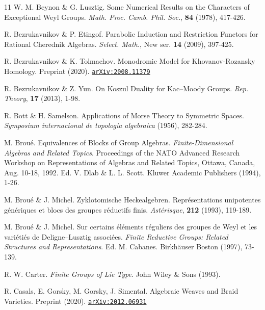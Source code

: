\documentclass[a4paper,10pt,leqno]{amsart}
\theoremstyle{plain}
\theoremstyle{plain}
\theoremstyle{plain}
\theoremstyle{definition}
\theoremstyle{remark}
\begin{document}
\begin{thebibliography}{11}
	W. M. Beynon \& G. Lusztig.
	Some Numerical Results on the Characters of Exceptional Weyl Groups.
	\textsl{Math. Proc. Camb. Phil. Soc.},
	\textbf{84}
	(1978),
	417-426.

	R. Bezrukavnikov \& P. Etingof.
	Parabolic Induction and Restriction Functors for Rational Cherednik Algebras.
	\textsl{Select. Math.},
	New ser. \textbf{14}
	(2009),
	397-425.

	R. Bezrukavnikov \& K. Tolmachov.
	Monodromic Model for Khovanov-Rozansky Homology.
	Preprint
	(2020).
	\href{http://arxiv.org/abs/2008.11379}{\texttt{arXiv:2008.11379}}
	
	R. Bezrukavnikov \& Z. Yun.
	On Koszul Duality for Kac--Moody Groups.
	\textsl{Rep. Theory},
	\textbf{17}
	(2013),
	1-98.

	R. Bott \& H. Samelson.
	Applications of Morse Theory to Symmetric Spaces.
	\textsl{Symposium internacional de topologia algebraica}
	(1956),
	282-284.

	M. Brou\'e.
	Equivalences of Blocks of Group Algebras.
	\textsl{Finite-Dimensional Algebras and Related Topics}.
	Proceedings of the NATO Advanced Research Workshop on Representations of Algebras and Related Topics, Ottawa, Canada, Aug. 10-18, 1992.
	Ed. V. Dlab \& L. L. Scott.
	Kluwer Academic Publishers
	(1994),
	1-26.
	
	M. Brou\'e \& J. Michel.
	Zyklotomische Heckealgebren.
	Repr\'esentations unipotentes g\'en\'eriques et blocs des groupes r\'eductifs finis.
	\textsl{Ast\'erisque},
	\textbf{212}
	(1993),
	119-189.
	

	M. Brou\'e \& J. Michel.
	Sur certains \'el\'ements r\'eguliers des groupes de Weyl et les vari\'eti\'es de Deligne--Lusztig associ\'ees.
	\textsl{Finite Reductive Groups: Related Structures and Representations}.
	Ed. M. Cabanes.
	Birkh\"auser Boston
	(1997),
	73-139.	


	R. W. Carter.
	\textsl{Finite Groups of Lie Type}.
	John Wiley \& Sons
	(1993).
	
	R. Casals, E. Gorsky, M. Gorsky, J. Simental.
	Algebraic Weaves and Braid Varieties.
	Preprint (2020).
	\href{https://arxiv.org/abs/2012.06931}{\texttt{arXiv:2012.06931}}
	

\end{thebibliography}
\end{document}

